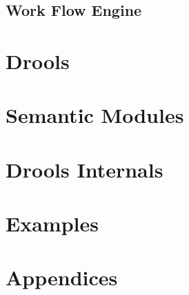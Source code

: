 \documentclass[10pt,oneside,letterpaper,colorhighlight]{book}
\begin{document}
\chapter {Work Flow Engine}
\part{Drools}

%











\part{Semantic Modules}









\part{Drools Internals}










\part{Examples}







\part{Appendices}
\appendix










\backmatter
{\footnotesize
\pagestyle{plain}
\printindex
}

%
\end{document}
